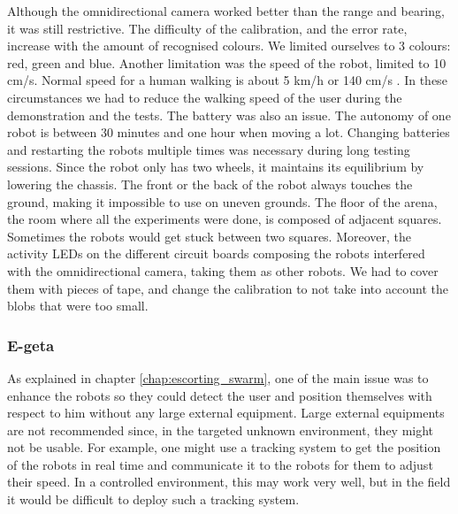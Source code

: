 \documentclass[oneside, a4paper, 12pt]{memoir}
\begin{document}
		Although the omnidirectional camera worked better than the range and bearing, it was still restrictive. The difficulty of the calibration, and the error rate, increase with the amount of recognised colours. We limited ourselves to 3 colours: red, green and blue. Another limitation was the speed of the robot, limited to 10 cm/s. Normal speed for a human walking is about 5 km/h or 140 cm/s \citep{wiki:002}. In these circumstances we had to reduce the walking speed of the user during the demonstration and the tests. The battery was also an issue. The autonomy of one robot is between 30 minutes and one hour when moving a lot. Changing batteries and restarting the robots multiple times was necessary during long testing sessions. Since the robot only has two wheels, it maintains its equilibrium by lowering the chassis. The front or the back of the robot always touches the ground, making it impossible to use on uneven grounds. The floor of the arena, the room where all the experiments were done, is composed of adjacent squares. Sometimes the robots would get stuck between two squares. Moreover, the activity LEDs on the different circuit boards composing the robots interfered with the omnidirectional camera, taking them as other robots. We had to cover them with pieces of tape, and change the calibration to not take into account the blobs that were too small.
		
		\subsubsection{E-geta} %

		
	As explained in chapter \ref{chap:escorting_swarm}, one of the main issue was to enhance the robots so they could detect the user and position themselves with respect to him without any large external equipment. Large external equipments are not recommended since, in the targeted unknown environment, they might not be usable. For example, one might use a tracking system to get the position of the robots in real time and communicate it to the robots for them to adjust their speed. In a controlled environment, this may work very well, but in the field it would be difficult to deploy such a tracking system.
	
\end{document}
